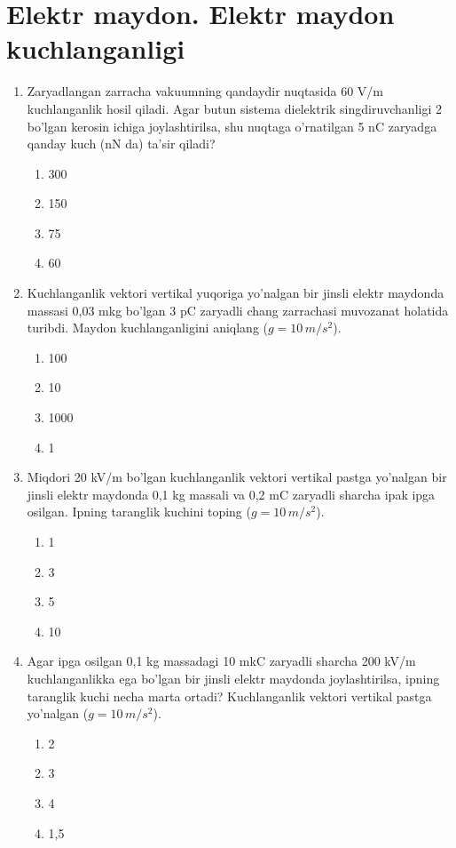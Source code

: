 \section{Elektr maydon. Elektr maydon kuchlanganligi}


\begin{enumerate}

    \item Zaryadlangan zarracha vakuumning qandaydir nuqtasida 60 V/m kuchlanganlik hosil qiladi. Agar butun sistema dielektrik singdiruvchanligi 2 bo’lgan kerosin ichiga joylashtirilsa, shu nuqtaga o’rnatilgan 5 nC zaryadga qanday kuch (nN da) ta’sir qiladi? 
    \begin{enumerate}[label=\Alph*)]
        \item 300
        \item 150 %
        \item 75
        \item 60
    \end{enumerate}

    \item Kuchlanganlik vektori vertikal yuqoriga yo’nalgan bir jinsli elektr maydonda massasi 0,03 mkg bo’lgan 3 pC zaryadli chang zarrachasi muvozanat holatida turibdi. Maydon kuchlanganligini aniqlang ($g=10 \, m/s^2$). 
    \begin{enumerate}[label=\Alph*)]
        \item 100 %
        \item 10
        \item 1000
        \item 1
    \end{enumerate}

    \item Miqdori 20 kV/m bo’lgan kuchlanganlik vektori vertikal pastga yo’nalgan bir jinsli elektr maydonda 0,1 kg massali va 0,2 mC zaryadli sharcha ipak ipga osilgan. Ipning taranglik kuchini toping ($g=10 \, m/s^2$). 
    \begin{enumerate}[label=\Alph*)]
        \item 1
        \item 3
        \item 5 %
        \item 10
    \end{enumerate}

    \item Agar ipga osilgan 0,1 kg massadagi 10 mkC zaryadli sharcha 200 kV/m kuchlanganlikka ega bo’lgan bir jinsli elektr maydonda joylashtirilsa, ipning taranglik kuchi necha marta ortadi? Kuchlanganlik vektori vertikal pastga yo’nalgan ($g=10 \, m/s^2$). 
    \begin{enumerate}[label=\Alph*)]
        \item 2
        \item 3 %
        \item 4
        \item 1,5
    \end{enumerate}


\end{enumerate}
